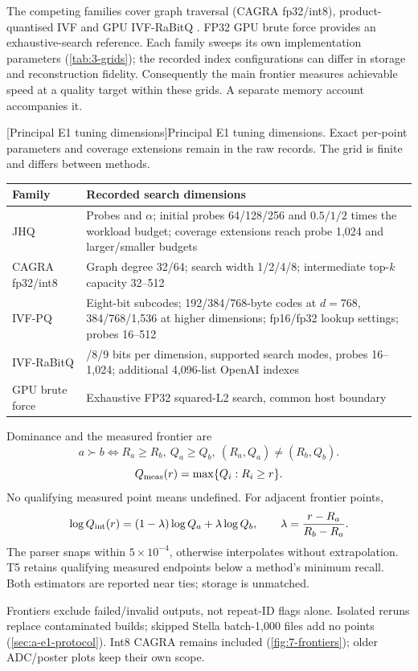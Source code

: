 The competing families cover graph traversal (CAGRA fp32/int8),
product-quantised IVF and GPU IVF-RaBitQ \cite{cagra,pq,ivfrabitq}.
FP32 GPU brute force provides an exhaustive-search reference. Each family
sweeps its own implementation parameters (\cref{tab:3-grids}); the recorded
index configurations can differ in storage and reconstruction fidelity.
Consequently the main frontier measures achievable speed at a quality
target within these grids. A separate memory account accompanies it.

\par\medskip\noindent\begin{minipage}{\linewidth}
\centering\captionsetup{hypcap=false}
[Principal E1 tuning dimensions]{Principal E1 tuning dimensions. Exact per-point parameters and
coverage extensions remain in the raw records. The grid is finite and
differs between methods.}
\label{tab:3-grids}
\footnotesize\setlength{\tabcolsep}{4pt}
\begin{tabularx}{\linewidth}{@{}>{\raggedright\arraybackslash}p{.22\linewidth}>{\raggedright\arraybackslash}X@{}}
\toprule
Family & Recorded search dimensions \\
\midrule
JHQ & Probes and $\alpha$; initial probes 64/128/256 and
$0.5/1/2$ times the workload budget; coverage extensions reach probe
1,024 and larger/smaller budgets \\
CAGRA fp32/int8 & Graph degree 32/64; search width 1/2/4/8;
intermediate top-$k$ capacity 32--512 \\
IVF-PQ & Eight-bit subcodes; 192/384/768-byte codes at $d=768$,
384/768/1,536 at higher dimensions; fp16/fp32 lookup settings;
probes 16--512 \\
IVF-RaBitQ & 4/8/9 bits per dimension, supported search modes,
probes 16--1,024; additional 4,096-list OpenAI indexes \\
GPU brute force & Exhaustive FP32 squared-L2 search, common host boundary \\
\bottomrule
\end{tabularx}
\end{minipage}\par\medskip

Dominance and the measured frontier are
\[
 a\succ b\iff R_a\geq R_b,\ Q_a\geq Q_b,\
 (R_a,Q_a)\ne(R_b,Q_b).
\]
\begin{equation}
Q_{\rm meas}(r)=\max\{Q_i:R_i\geq r\}.
\label{eq:3-measured-frontier}
\end{equation}
No qualifying measured point means undefined. For adjacent frontier points,
\begin{equation}
\log Q_{\rm int}(r)=(1-\lambda)\log Q_a+\lambda\log Q_b,
\qquad \lambda=\frac{r-R_a}{R_b-R_a}.
\label{eq:3-interpolated-frontier}
\end{equation}
The parser snaps within $5\times10^{-4}$, otherwise interpolates without extrapolation. T5 retains qualifying measured endpoints below a method's minimum recall. Both estimators are reported near ties; storage is unmatched.

Frontiers exclude failed/invalid outputs, not repeat-ID flags alone. Isolated reruns replace contaminated builds; skipped Stella batch-1,000 files add no points (\cref{sec:a-e1-protocol}). Int8 CAGRA remains included (\cref{fig:7-frontiers}); older ADC/poster plots keep their own scope.